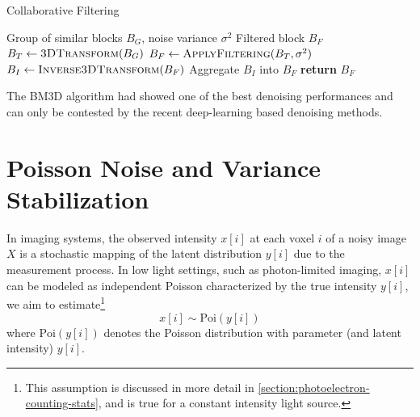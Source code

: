 \begin{algorithm}
    \caption{Collaborative Filtering}\label{alg:collaborativefiltering}
    \begin{algorithmic}[1]
    \Require Group of similar blocks $B_{G}$, noise variance $\sigma^2$
    \Ensure Filtered block $B_{F}$
        \State $B_{T} \gets \textsc{3DTransform}(B_{G})$
        \State $B_{F} \gets \textsc{ApplyFiltering}(B_{T}, \sigma^2)$
        \State $B_{I} \gets \textsc{Inverse3DTransform}(B_{F})$
        \State Aggregate $B_{I}$ into $B_{F}$
        \State \textbf{return} $B_{F}$
    \EndProcedure
    \end{algorithmic}
\end{algorithm}

The \gls{BM3D} algorithm had showed one of the best denoising performances and can only be contested by the recent deep-learning based denoising methods. 

\section{Poisson Noise and Variance Stabilization}\label{sec:poisson-noise-model}
In imaging systems, the observed intensity $x[i]$ at each voxel $i$ of a noisy image $X$ is a stochastic mapping of the latent distribution $y[i]$ due to the measurement process. In low light settings, such as photon-limited imaging, $x[i]$ can be modeled as independent Poisson characterized by the true intensity $y[i]$, we aim to estimate\footnote{This assumption is discussed in more detail in \cref{section:photoelectron-counting-stats}, and is true for a constant intensity light source.} \cite{makitaloOptimalInversionAnscombe2011,kimDeepLearningbasedStatistical2021} 
\begin{equation*}
    x[i] \sim \text{Poi}(y[i])
\end{equation*}
where $\text{Poi}(y[i])$ denotes the Poisson distribution with parameter (and latent intensity) $y[i]$. 

